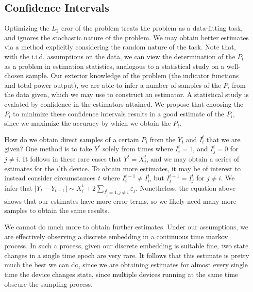 \documentclass{article}
\begin{document}
\subsection{Confidence Intervals}

Optimizing the $L_2$ eror of the problem treats the problem as a data-fitting task, and ignores the stochastic nature of the problem. We may obtain better estimates via a method explicitly considering the random nature of the task. Note that, with the i.i.d. assumptions on the data, we can view the determination of the $P_i$ as a problem in estimation statistics, analogous to a statistical study on a well-chosen sample. Our exterior knowledge of the problem (the indicator functions and total power output), we are able to infer a number of samples of the $P_i$ from the data given, which we may use to construct an estimator. A statistical study is evalated by confidence in the estimators attained. We propose that choosing the $P_i$ to minimize these confidence intervals results in a good estimate of the $P_i$, since we maximize the accuracy by which we obtain the $P_i$.

How do we obtain direct samples of a certain $P_i$ from the $Y_t$ and $I_i^t$ that we are given? One method is to take $Y^t$ solely from times where $I_i^t = 1$, and $I_j^t = 0$ for $j \neq i$. It follows in these rare cases that $Y^t = X_i^t$, and we may obtain a series of estimates for the $i$'th device. To obtain more estimates, it may be of interest to instead consider circumstances $t$ where $I_i^{t-1} \neq I_i^t$, but $I_j^{t-1} = I_j^t$ for $j \neq i$. We infer that $|Y_t - Y_{t-1}| \sim X_i^t + 2 \sum_{I_j^t = 1, j \neq i} \varepsilon_j$. Nonetheless, the equation above shows that our estimates have more error terms, so we likely need many more samples to obtain the same results.

We cannot do much more to obtain further estimates. Under our assumptions, we are effectively observing a discrete embedding in a continuous time markov process. In such a process, given our discrete embedding is suitable fine, two state changes in a single time epoch are very rare. It follows that this estimate is pretty much the best we can do, since we are obtaining estimates for almost every single time the device changes state, since multiple devices running at the same time obscure the sampling process.
\end{document}
